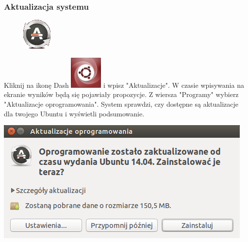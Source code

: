 \subsubsection{Aktualizacja systemu}
\begin{figure}
        \includegraphics[width=\linewidth]{images/pierwsze_uruchomienie_aktualizacja1.png}
\end{figure}
Kliknij na ikonę Dash \includegraphics[scale=0.35]{images/ikony_dash.png} i wpisz "Aktualizacje". W czasie wpisywania na ekranie wyników będą się pojawiały propozycje. Z wiersza "Programy" wybierz "Aktualizacje oprogramowania".
System sprawdzi, czy dostępne są aktualizacje dla twojego Ubuntu i wyświetli podsumowanie.
\begin{center}
        \includegraphics{images/pierwsze_uruchomienie_aktualizacja2.png}
\end{center}
